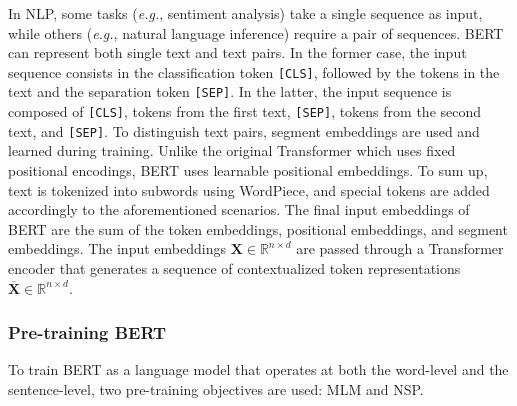 In \ac{NLP}, some tasks (\textit{e.g.}, sentiment analysis) take a single sequence as input, while others (\textit{e.g.}, natural language inference) require a pair of sequences. \ac{BERT} can represent both single text and text pairs. In the former case, the input sequence consists in the classification token \texttt{[CLS]}, followed by the tokens in the text and the separation token \texttt{[SEP]}. In the latter, the input sequence is composed of \texttt{[CLS]}, tokens from the first text, \texttt{[SEP]}, tokens from the second text, and \texttt{[SEP]}. To distinguish text pairs, segment embeddings are used and learned during training. Unlike the original Transformer which uses fixed positional encodings, \ac{BERT} uses learnable positional embeddings. To sum up, text is tokenized into subwords using WordPiece, and special tokens are added accordingly to the aforementioned scenarios. The final input embeddings of \ac{BERT} are the sum of the token embeddings, positional embeddings, and segment embeddings. The input embeddings $\bm{X} \in \mathbb{R}^{n \times d}$ are passed through a Transformer encoder that generates a sequence of contextualized token representations $\overline{\bm{X}} \in \mathbb{R}^{n \times d}$.


\subsubsection{Pre-training BERT}

To train \ac{BERT} as a language model that operates at both the word-level and the sentence-level, two pre-training objectives are used: \ac{MLM} and \ac{NSP}. 


